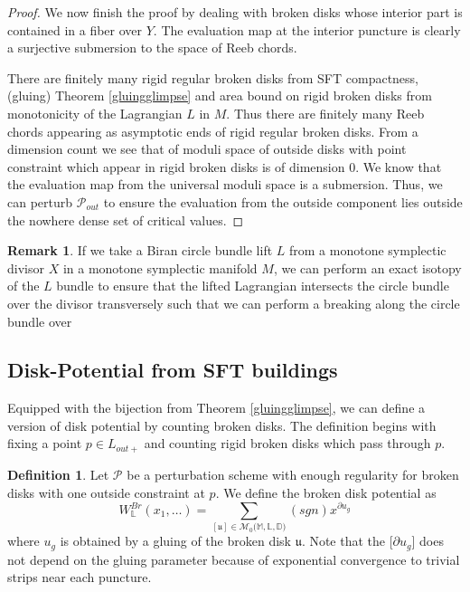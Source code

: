 \documentclass[11pt, oneside,dvipsnames]{amsart}
\newcommand{\<}{\langle}
\renewcommand{\>}{\rangle}
\newcommand{\outp}{{out+}}
\newcommand{\bD}{\mathbb{D}}
\newcommand{\bL}{\mathbb{L}}
\newcommand{\bM}{\mathbb{M}}
\newcommand{\cM}{\mathcal{M}}
\newcommand{\cP}{\mathcal{P}}
\theoremstyle{definition}
\theoremstyle{definition}
\newtheorem{remark}[Theorem]{Remark}
\newtheorem{defn}[Theorem]{Definition}
\numberwithin{equation}{subsection}
\begin{document}
\begin{proof}
We now finish the proof by dealing with broken disks whose interior part is contained in a fiber over $Y$. The evaluation map at the interior puncture is clearly a surjective submersion to the space of Reeb chords. 


There are finitely many rigid regular broken disks from  SFT compactness, (gluing) Theorem \ref{gluingglimpse} and area bound on rigid broken disks from monotonicity of the Lagrangian $L$ in $M$. Thus there are finitely many Reeb chords appearing as asymptotic ends of rigid regular broken disks. From a dimension count we see that of moduli space of outside disks with point constraint which appear in rigid broken disks is of dimension 0. We know that the evaluation map from the universal moduli space is a submersion. Thus, we can perturb $\cP_{out}$ to ensure the evaluation from the outside component lies outside the nowhere dense set of critical values.

\end{proof}


\begin{remark} 
    If we take a Biran circle bundle lift $L$ from a monotone symplectic divisor $X$ in a monotone symplectic manifold $M$,
    we can perform an exact isotopy of the $L$ bundle to ensure that the lifted Lagrangian 
    intersects the circle bundle over the divisor transversely such that we can perform a breaking along
    the circle bundle over 
\end{remark}


\subsection{Disk-Potential from SFT buildings}

Equipped with the bijection from Theorem \ref{gluingglimpse}, we can define a version of disk potential by counting broken disks. The definition begins with fixing a point $p\in L_\outp$ and counting rigid broken
disks which pass through $p$.
\begin{defn}
    Let $\cP$ be a perturbation scheme with enough regularity for broken disks with one outside constraint at $p$. We define the 
    broken disk potential as 
\begin{equation*}
        W^{Br}_{\bL} (x_1,\dots) = \sum_{[\mathfrak{u}] \in \cM_{0}{(\bM,\bL,\bD})} (sgn) x^{\partial u_g}
    \end{equation*}
where $u_g$ is obtained by a gluing of the broken disk $\mathfrak{u}$. Note that the [$\partial u_g$] does not depend on the gluing parameter because of exponential convergence to trivial strips near each puncture.
\end{defn}
\end{document}
